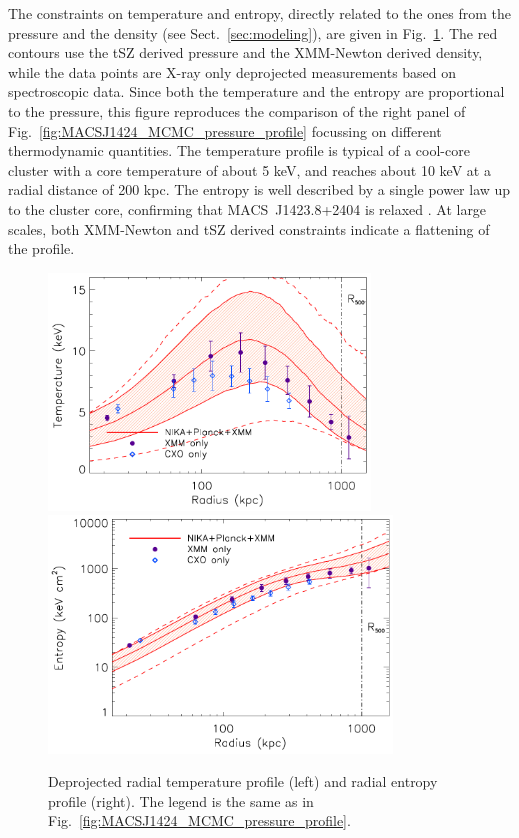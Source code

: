 \documentclass[twocolumn,traditabstract]{aa}
\begin{document}
The constraints on temperature and entropy, directly related to the ones from the pressure and the density (see Sect.~\ref{sec:modeling}), are given in Fig.~\ref{fig:MACSJ1424_MCMC_tk_profile}. The red contours use the tSZ derived pressure and the XMM-Newton derived density, while the data points are X-ray only deprojected measurements based on spectroscopic data. Since both the temperature and the entropy are proportional to the pressure, this figure reproduces the comparison of the right panel of Fig.~\ref{fig:MACSJ1424_MCMC_pressure_profile} focussing on different thermodynamic quantities. The temperature profile is typical of a cool-core cluster with a core temperature of about 5 keV, and reaches about 10 keV at a radial distance of 200 kpc. The entropy is well described by a single power law up to the cluster core, confirming that \mbox{MACS~J1423.8+2404} is relaxed \citep{guennou2014}. At large scales, both XMM-Newton and tSZ derived constraints indicate a flattening of the profile.
\begin{figure}[h]
\centering
\includegraphics[height=6.3cm]{Figure/ICM_temperature_profile.pdf}
\includegraphics[height=6.3cm]{Figure/ICM_entropy_profile.pdf}
\caption{Deprojected radial temperature profile (left) and radial entropy profile (right). The legend is the same as in Fig.~\ref{fig:MACSJ1424_MCMC_pressure_profile}.}
\label{fig:MACSJ1424_MCMC_tk_profile}
\end{figure}
\end{document}
